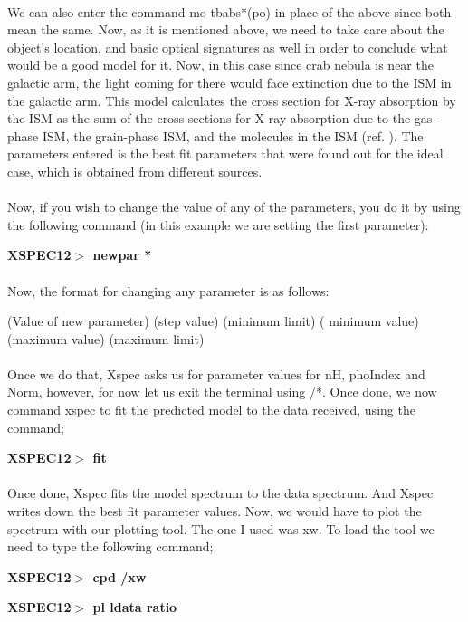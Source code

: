\documentclass[a4paper,twoside]{report}
\numberwithin{equation}{section}
\begin{document}
\paragraph{}
We can also enter the command mo tbabs*(po) in place of the above since both mean the same. Now, as it is mentioned above, we need to take care about the object's location, and basic optical signatures as well in order to conclude what would be a good model for it. Now, in this case since crab nebula is near the galactic arm, the light coming for there would face extinction due to the ISM in the galactic arm. This model calculates the cross section for X-ray absorption by the ISM as the sum of the cross sections for X-ray absorption due to the gas-phase ISM, the grain-phase ISM, and the molecules in the ISM (ref. ). The parameters entered is the best fit parameters that were found out for the ideal case, which is obtained from different sources. 
\paragraph{}
Now, if you wish to change the value of any of the parameters, you do it by using the following command (in this example we are setting the first parameter):
\begin{center}
\item \large \textbf{XSPEC12$>$ newpar *}
\end{center}
\paragraph{}
Now, the format for changing any parameter is as follows:
\begin{center}
\item \large (Value of new parameter) (step value) (minimum limit) ( minimum value) (maximum value) (maximum limit)
\end{center}
\paragraph{}
Once we do that, Xspec asks us for parameter values for nH, phoIndex and Norm, however, for now let us exit the terminal using /*. Once done, we now command xspec to fit the predicted model to the data received, using the command;
\begin{center}
\item \large \textbf{XSPEC12$>$ fit}
\end{center}
\paragraph{}
Once done, Xspec fits the model spectrum to the data spectrum. And Xspec writes down the best fit parameter values. Now, we would have to plot the spectrum with our plotting tool. The one I used was xw. To load the tool we need to type the following command; 
\begin{center}
\item \large \textbf{XSPEC12$>$ cpd /xw}
\item \large \textbf{XSPEC12$>$ pl ldata ratio}
\end{center}
\end{document}
